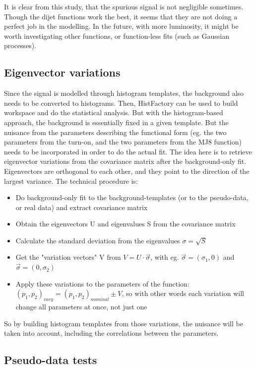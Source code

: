 It is clear from this study, that the spurious signal is not negligible sometimes. Though the dijet functions work the best, it seems that they are not doing a perfect job in the modelling. In the future, with more luminosity, it might be worth investigating other functions, or function-less fits (such as Gaussian processes).

\subsection{Eigenvector variations}

Since the signal is modelled through histogram templates, the background also needs to be converted to histograms. Then, HistFactory can be used to build workspace and do the statistical analysis.
But with the histogram-based approach, the background is essentially fixed in a given template. But the nuisance from the parameters describing the functional form (eg. the two parameters from the turn-on, and the two parameters from the MJ8 function) needs to be incorporated in order to do the actual fit. The idea here is to retrieve eigenvector variations from the covariance matrix after the background-only fit. Eigenvectors are orthogonal to each other, and they point to the direction of the largest variance. The technical procedure is:

\begin{itemize}
\item Do background-only fit to the background-templates (or to the pseudo-data, or real data) and extract covariance matrix
\item Obtain the eigenvectors U and eigenvalues S from the covariance matrix
\item Calculate the standard deviation from the eigenvalues $\sigma=\sqrt{S}$
\item Get the "variation vectors" V from $V=U\cdot \vec{\sigma}$, with eg. $\vec{\sigma}=(\sigma_1,0)$ and $\vec{\sigma}=(0,\sigma_2)$
\item Apply these variations to the parameters of the function: $\left(p_1,p_2\right)_{vary}=\left(p_1,p_2\right)_{nominal} \pm V$, so with other words each variation will change all parameters at once, not just one
\end{itemize}

So by building histogram templates from those variations, the nuisance will be taken into account, including the correlations between the parameters. 

\subsection{Pseudo-data tests}

